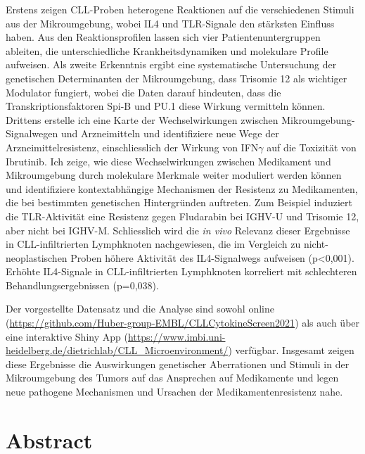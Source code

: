 \documentclass[11pt, a4paper, twosided]{book}
\begin{document}
\begin{sloppypar}
    Erstens zeigen CLL-Proben heterogene Reaktionen auf die verschiedenen Stimuli aus der Mikroumgebung, wobei IL4 und TLR-Signale den stärksten Einfluss haben. Aus den Reaktionsprofilen lassen sich vier Patientenuntergruppen ableiten, die unterschiedliche Krankheitsdynamiken und molekulare Profile aufweisen. Als zweite Erkenntnis ergibt eine systematische Untersuchung der genetischen Determinanten der Mikroumgebung, dass Trisomie 12 als wichtiger Modulator fungiert, wobei die Daten darauf hindeuten, dass die Transkriptionsfaktoren Spi-B und PU.1 diese Wirkung vermitteln können. Drittens erstelle ich eine Karte der Wechselwirkungen zwischen Mikroumgebung-Signalwegen und Arzneimitteln und identifiziere neue Wege der Arzneimittelresistenz, einschliesslich der Wirkung von IFN\(\gamma\) auf die Toxizität von Ibrutinib. Ich zeige, wie diese Wechselwirkungen zwischen Medikament und Mikroumgebung durch molekulare Merkmale weiter moduliert werden können und identifiziere kontextabhängige Mechanismen der Resistenz zu Medikamenten, die bei bestimmten genetischen Hintergründen auftreten. Zum Beispiel induziert die TLR-Aktivität eine Resistenz gegen Fludarabin bei IGHV-U und Trisomie 12, aber nicht bei IGHV-M. Schliesslich wird die \emph{in vivo} Relevanz dieser Ergebnisse in CLL-infiltrierten Lymphknoten nachgewiesen, die im Vergleich zu nicht-neoplastischen Proben höhere Aktivität des IL4-Signalwegs aufweisen (p\textless0,001). Erhöhte IL4-Signale in CLL-infiltrierten Lymphknoten korreliert mit schlechteren Behandlungsergebnissen (p=0,038).

    Der vorgestellte Datensatz und die Analyse sind sowohl online (\url{https://github.com/Huber-group-EMBL/CLLCytokineScreen2021}) als auch über eine interaktive Shiny App (\url{https://www.imbi.uni-heidelberg.de/dietrichlab/CLL_Microenvironment/}) verfügbar. Insgesamt zeigen diese Ergebnisse die Auswirkungen genetischer Aberrationen und Stimuli in der Mikroumgebung des Tumors auf das Ansprechen auf Medikamente und legen neue pathogene Mechanismen und Ursachen der Medikamentenresistenz nahe.
\end{sloppypar}


\newpage\null\newpage


    \hypertarget{abstract}{%
    \chapter*{Abstract}\label{abstract}}
\end{document}
